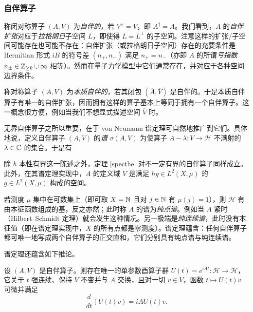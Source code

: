 \subsubsection{自伴算子}
称闭对称算子 $(A,V)$ 为\emph{自伴的}，若 $V^\vee=V$，即 $A^\dagger=A$。我们看到，$A$ 的\emph{自伴扩张}对应于\emph{拉格朗日}子空间 $L$，即使得 $L=L^\perp$ 的子空间。注意这样的扩张/子空间可能存在也可能不存在：自伴扩张（或拉格朗日子空间）存在的充要条件是 Hermitian 形式 $iB$ 的符号差 $(n_+,n_-)$ 满足 $n_+=n_-$（亦即 $A$ 的所谓\emph{亏指数} $n_\pm \in \Bbb Z_{\ge 0}\cup\infty$ 相等）。然而在量子力学模型中它们通常存在，并对应于各种空间边界条件。


称对称算子 $(A,V)$ 为\emph{本质自伴的}，若其闭包 $(\overline A,\overline V)$ 是自伴的。于是本质自伴算子有唯一的自伴扩张，因而拥有这样的算子基本上等同于拥有一个自伴算子。这一概念很方便，例如当我们不想显式描述空间 $\overline V$ 时。

无界自伴算子之所以重要，在于 von Neumann 谱定理可自然地推广到它们。具体地说，定义自伴算子 $(A,V)$ 的\emph{谱} $\sigma(A,V)$ 为使算子 $A-\lambda: V\to \mathcal H$ 不满射的 $\lambda\in \Bbb C$ 的集合。于是有

\begin{theorem} 除 $h$ 本性有界这一陈述之外，定理 \ref{specthe} 对不一定有界的自伴算子同样成立。此外，在其谱定理实现中，$A$ 的定义域 $V$ 是满足 $hg\in L^2(X,\mu)$ 的 $g\in L^2(X,\mu)$ 构成的空间。
\end{theorem}

若测度 $\mu$ 集中在可数集上（即可取 $X=\Bbb N$ 且对 $j\in \Bbb N$ 有 $\mu(j)=1$），则 $\mathcal H$ 有由本征函数组成的基，反之亦然；此时称 $A$ 的谱为\emph{纯点谱}。例如当 $A$ 紧时（Hilbert–Schmidt 定理）就会发生这种情况。另一极端是\emph{纯连续谱}，此时没有本征值（即在谱定理实现中，$X$ 的所有点都是零测度）。谱定理蕴含：任何自伴算子都可唯一地写成两个自伴算子的正交直和，它们分别具有纯点谱与纯连续谱。

谱定理还蕴含如下推论。

\begin{corollary} 设 $(A,V)$ 是自伴算子。则存在唯一的单参数酉算子群 $U(t)=e^{iAt}: \mathcal H\to \mathcal H$，它关于 $t$ 强连续、保持 $V$ 不变并与 $A$ 交换，且对一切 $v\in V$，函数 $t\mapsto U(t)v$ 可微并满足
$$
\frac{d}{dt}(U(t)v)=iAU(t)v.
$$
\end{corollary}

